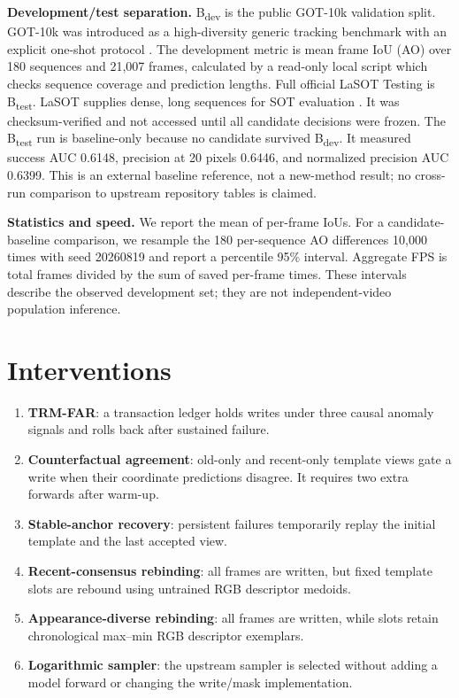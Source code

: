\documentclass{article}
\begin{document}
\noindent\textbf{Development/test separation.} B\textsubscript{dev} is the public
GOT-10k validation split. GOT-10k was introduced as a high-diversity generic
tracking benchmark with an explicit one-shot protocol \cite{huang2021got10k}.
The development metric is mean frame IoU (AO) over 180 sequences and 21,007
frames, calculated by a read-only local script which checks sequence coverage
and prediction lengths. Full official LaSOT Testing is B\textsubscript{test}.
LaSOT supplies dense, long sequences for SOT evaluation \cite{fan2019lasot}.
It was checksum-verified and not accessed until all candidate decisions were
frozen. The B\textsubscript{test} run is baseline-only because no candidate
survived B\textsubscript{dev}. It measured success AUC 0.6148, precision at
20 pixels 0.6446, and normalized precision AUC 0.6399. This is an external
baseline reference, not a new-method result; no cross-run comparison to
upstream repository tables is claimed.

\noindent\textbf{Statistics and speed.} We report the mean of per-frame IoUs. For a
candidate-baseline comparison, we resample the 180 per-sequence AO differences
10,000 times with seed 20260819 and report a percentile 95\% interval. Aggregate
FPS is total frames divided by the sum of saved per-frame times. These intervals
describe the observed development set; they are not independent-video
population inference.

\section{Interventions}
\begin{enumerate}
  \item \textbf{TRM-FAR}: a transaction ledger holds writes under three causal
  anomaly signals and rolls back after sustained failure.
  \item \textbf{Counterfactual agreement}: old-only and recent-only template
  views gate a write when their coordinate predictions disagree. It requires
  two extra forwards after warm-up.
  \item \textbf{Stable-anchor recovery}: persistent failures temporarily replay
  the initial template and the last accepted view.
  \item \textbf{Recent-consensus rebinding}: all frames are written, but fixed
  template slots are rebound using untrained RGB descriptor medoids.
  \item \textbf{Appearance-diverse rebinding}: all frames are written, while
  slots retain chronological max--min RGB descriptor exemplars.
  \item \textbf{Logarithmic sampler}: the upstream sampler is selected without
  adding a model forward or changing the write/mask implementation.
\end{enumerate}
\end{document}
